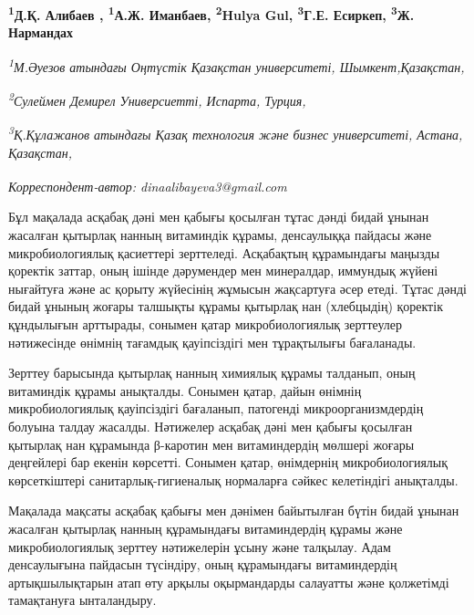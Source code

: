 
\begin{articleheader}

{\bfseries 
\textsuperscript{1}Д.Қ. Алибаев\textsuperscript{\envelope } \authorid,
\textsuperscript{1}А.Ж. Иманбаев\authorid,
\textsuperscript{2}Hulya Gul\authorid,
\textsuperscript{3}Г.Е. Есиркеп\authorid,
\textsuperscript{3}Ж. Нармандах\authorid}
\end{articleheader}

\begin{affiliation}
\emph{\textsuperscript{1}М.Әуезов атындағы Оңтүстік Қазақстан университеті, Шымкент,Қазақстан,}

\emph{\textsuperscript{2}Сулеймен Демирел Универсиетті, Испарта, Турция,}

\emph{\textsuperscript{3}Қ.Құлажанов атындағы Қазақ технология және бизнес университеті, Астана, Қазақстан,}

\textsuperscript{\envelope }{\em Корреспондент-автор: dinaalibayeva3@gmail.com}
\end{affiliation}

Бұл мақалада асқабақ дәні мен қабығы қосылған тұтас дәнді бидай ұнынан
жасалған қытырлақ нанның витаминдік құрамы, денсаулыққа пайдасы және
микробиологиялық қасиеттері зерттеледі. Асқабақтың құрамындағы маңызды
қоректік заттар, оның ішінде дәрумендер мен минералдар, иммундық жүйені
нығайтуға және ас қорыту жүйесінің жұмысын жақсартуға әсер етеді. Тұтас
дәнді бидай ұнының жоғары талшықты құрамы қытырлақ нан (хлебцыдің)
қоректік құндылығын арттырады, сонымен қатар микробиологиялық зерттеулер
нәтижесінде өнімнің тағамдық қауіпсіздігі мен тұрақтылығы бағаланады.

Зерттеу барысында қытырлақ нанның химиялық құрамы талданып, оның
витаминдік құрамы анықталды. Сонымен қатар, дайын өнімнің
микробиологиялық қауіпсіздігі бағаланып, патогенді микроорганизмдердің
болуына талдау жасалды. Нәтижелер асқабақ дәні мен қабығы қосылған
қытырлақ нан құрамында β-каротин мен витаминдердің мөлшері жоғары
деңгейлері бар екенін көрсетті. Сонымен қатар, өнімдернің
микробиологиялық көрсеткіштері санитарлық-гигиеналық нормаларға сәйкес
келетіндігі анықталды.

Мақалада мақсаты асқабақ қабығы мен дәнімен байытылған бүтін бидай
ұнынан жасалған қытырлақ нанның құрамындағы витаминдердің құрамы және
микробиологиялық зерттеу нәтижелерін ұсыну және талқылау. Адам
денсаулығына пайдасын түсіндіру, оның құрамындағы витаминдердің
артықшылықтарын атап өту арқылы оқырмандарды салауатты және қолжетімді
тамақтануға ынталандыру.

